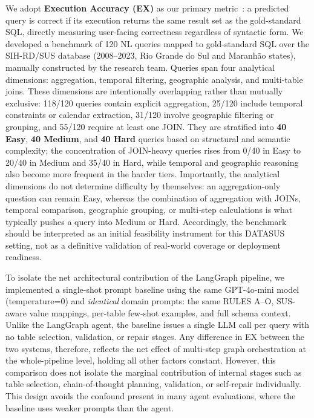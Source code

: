 \documentclass[conference]{IEEEtran}
\begin{document}
We adopt \textbf{Execution Accuracy (EX)} as our primary metric~\cite{yu2018spider,hong2024survey,zhang2023actsql,mohammadjafari2024review}: a predicted query is correct if its execution returns the same result set as the gold-standard SQL, directly measuring user-facing correctness regardless of syntactic form.
We developed a benchmark of 120 NL queries mapped to gold-standard SQL over the SIH-RD/SUS database (2008--2023, Rio Grande do Sul and Maranh\~ao states), manually constructed by the research team. Queries span four analytical dimensions: aggregation, temporal filtering, geographic analysis, and multi-table joins. These dimensions are intentionally overlapping rather than mutually exclusive: 118/120 queries contain explicit aggregation, 25/120 include temporal constraints or calendar extraction, 31/120 involve geographic filtering or grouping, and 55/120 require at least one JOIN. They are stratified into \textbf{40 Easy}, \textbf{40 Medium}, and \textbf{40 Hard} queries based on structural and semantic complexity; the concentration of JOIN-heavy queries rises from 0/40 in Easy to 20/40 in Medium and 35/40 in Hard, while temporal and geographic reasoning also become more frequent in the harder tiers. Importantly, the analytical dimensions do not determine difficulty by themselves: an aggregation-only question can remain Easy, whereas the combination of aggregation with JOINs, temporal comparison, geographic grouping, or multi-step calculations is what typically pushes a query into Medium or Hard. Accordingly, the benchmark should be interpreted as an initial feasibility instrument for this DATASUS setting, not as a definitive validation of real-world coverage or deployment readiness. %

To isolate the net architectural contribution of the LangGraph pipeline, we implemented a single-shot prompt baseline using the same GPT-4o-mini model~\cite{openai2024gpt4omini} (temperature=0) and \emph{identical} domain prompts: the same RULES A--O, SUS-aware value mappings, per-table few-shot examples, and full schema context. Unlike the LangGraph agent, the baseline issues a single LLM call per query with no table selection, validation, or repair stages. Any difference in EX between the two systems, therefore, reflects the net effect of multi-step graph orchestration at the whole-pipeline level, holding all other factors constant. However, this comparison does not isolate the marginal contribution of internal stages such as table selection, chain-of-thought planning, validation, or self-repair individually. This design avoids the confound present in many agent evaluations, where the baseline uses weaker prompts than the agent.
\end{document}
